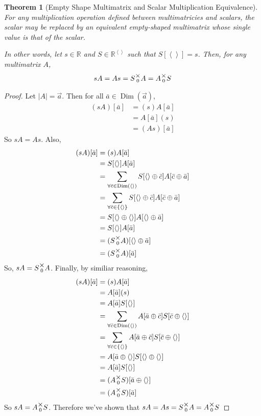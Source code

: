 \documentclass[12pt]{book}
\theoremstyle{plain}
\newtheorem{theorem}{Theorem}[chapter]
\theoremstyle{definition}
\theoremstyle{ppart}
\theoremstyle{case}
\theoremstyle{solution}
\DeclareMathOperator{\Dim}{Dim}
\newcommand{\mmult}[1]{\text{\raisebox{1ex}{$\underset{#1}{\times}$}}}
\newcommand{\shape}[1]{\left|#1\right|}
\begin{document}
\begin{theorem}[Empty Shape Multimatrix and Scalar Multiplication Equivalence]
\label{s_mm_mult_equiv}
For any multiplication operation defined between multimatricies and scalars,
the scalar may be replaced by an equivalent empty-shaped multimatrix whose
single value is that of the scalar.

In other words, let $s \in \mathbb{R}$ and $S \in \mathbb{R}^{\left<\right>}$ such that
$S[\left<\right>] = s$. Then, for any multimatrix $A$, 
\[ sA = As = S \mmult{0} A = A \mmult{0} S \]
\end{theorem}
\begin{proof}
Let $\shape{A} = \vec{a}$. Then for all $\bar{a} \in \Dim(\vec{a})$,
\begin{align*}
	(sA)[\bar{a}]
	&= (s)A[\bar{a}] \\
	&= A[\bar{a}](s) \\
	&= (As)[\bar{a}]
\end{align*}
So $sA = As$. Also,
\begin{align*}
	(sA)[\bar{a}]
	&= (s)A[\bar{a}] \\
	&= S[\left<\right>]A[\bar{a}] \\
	&= \sum_{\forall \bar{c} \in \Dim(\left<\right>)}
		S[\left<\right> \oplus \bar{c}]A[\bar{c} \oplus \bar{a}] \\
	&= \sum_{\forall \bar{c} \in \{\left<\right>\}}
		S[\left<\right> \oplus \bar{c}]A[\bar{c} \oplus \bar{a}] \\
	&= S[\left<\right> \oplus \left<\right>]A[\left<\right> \oplus \bar{a}] \\
	&= S[\left<\right>]A[\bar{a}] \\
	&= (S \mmult{0} A)[\left<\right> \oplus \bar{a}] \\
	&= (S \mmult{0} A)[\bar{a}] \\
\end{align*}
So, $sA = S \mmult{0} A$.
Finally, by similiar reasoning,
\begin{align*}
	(sA)[\bar{a}]
	&= (s)A[\bar{a}] \\
	&= A[\bar{a}](s) \\
	&= A[\bar{a}]S[\left<\right>] \\
	&= \sum_{\forall \bar{c} \in \Dim(\left<\right>)}
		A[\bar{a} \oplus \bar{c}] S[\bar{c} \oplus \left<\right>] \\
	&= \sum_{\forall \bar{c} \in \{\left<\right>\}}
		A[\bar{a} \oplus \bar{c}] S[\bar{c} \oplus \left<\right>] \\
	&= A[\bar{a} \oplus \left<\right>] S[\left<\right> \oplus \left<\right>] \\
	&= A[\bar{a}]S[\left<\right>] \\
	&= (A \mmult{0} S)[\bar{a} \oplus \left<\right>] \\
	&= (A \mmult{0} S)[\bar{a}]
\end{align*}
So $sA = A \mmult{0} S$. Therefore we've shown that
$sA = As = S \mmult{0} A = A \mmult{0} S$
\end{proof}
\end{document}
